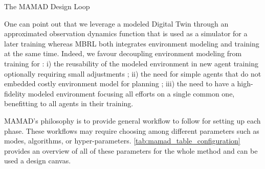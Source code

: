 \documentclass[pdflatex,sn-mathphys-num]{sn-jnl}%
\theoremstyle{thmstyleone}%
\theoremstyle{thmstyletwo}%
\theoremstyle{thmstylethree}%
\begin{document}
\begin{algorithm}[H]
    \caption{The MAMAD Design Loop}
    \label{alg:mamad-loop}
    \DontPrintSemicolon
\end{algorithm}

One can point out that we leverage a modeled Digital Twin through an approximated observation dynamics function that is used as a simulator for a later training whereas MBRL both integrates environment modeling and training at the same time. Indeed, we favour decoupling environment modeling from training for : i) the reusability of the modeled environment in new agent training optionally requiring small adjustments ; \quad ii) the need for simple agents that do not embedded costly environment model for planning ; \quad iii) the need to have a high-fidelity modeled environment focusing all efforts on a single common one, benefitting to all agents in their training.

MAMAD's philosophy is to provide general workflow to follow for setting up each phase. These workflows may require choosing among different parameters such as modes, algorithms, or hyper-parameters. \autoref{tab:mamad_table_configuration} provides an overview of all of these parameters for the whole method and can be used a design canvas.
\end{document}
